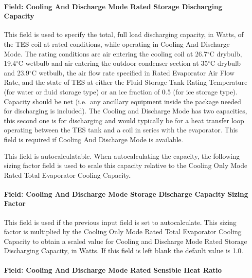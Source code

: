 \paragraph{Field: Cooling And Discharge Mode Rated Storage Discharging Capacity}\label{field-cooling-and-discharge-mode-rated-storage-discharging-capacity}

This field is used to specify the total, full load discharging capacity, in Watts, of the TES coil at rated conditions, while operating in Cooling And Discharge Mode. The rating conditions are air entering the cooling coil at 26.7$^\circ$C drybulb, 19.4$^\circ$C wetbulb and air entering the outdoor condenser section at 35$^\circ$C drybulb and 23.9$^\circ$C wetbulb, the air flow rate specified in Rated Evaporator Air Flow Rate, and the state of TES at either the Fluid Storage Tank Rating Temperature (for water or fluid storage type) or an ice fraction of 0.5 (for ice storage type). Capacity should be net (i.e.~any ancillary equipment inside the package needed for discharging is included). The Cooling and Discharge Mode has two capacities, this second one is for discharging and would typically be for a heat transfer loop operating between the TES tank and a coil in series with the evaporator. This field is required if Cooling And Discharge Mode is available.

This field is autocalculatable. When autocalculating the capacity, the following sizing factor field is used to scale this capacity relative to the Cooling Only Mode Rated Total Evaporator Cooling Capacity.

\paragraph{Field: Cooling And Discharge Mode Storage Discharge Capacity Sizing Factor}\label{field-cooling-and-discharge-mode-storage-discharge-capacity-sizing-factor}

This field is used if the previous input field is set to autocalculate. This sizing factor is multiplied by the Cooling Only Mode Rated Total Evaporator Cooling Capacity to obtain a scaled value for Cooling and Discharge Mode Rated Storage Discharging Capacity, in Watts. If this field is left blank the default value is 1.0.

\paragraph{Field: Cooling And Discharge Mode Rated Sensible Heat Ratio}\label{field-cooling-and-discharge-mode-rated-sensible-heat-ratio}

